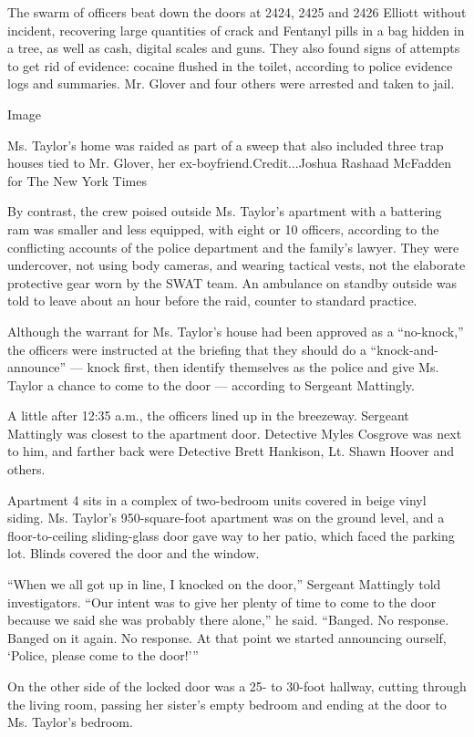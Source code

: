 The swarm of officers beat down the doors at 2424, 2425 and 2426 Elliott
without incident, recovering large quantities of crack and Fentanyl
pills in a bag hidden in a tree, as well as cash, digital scales and
guns. They also found signs of attempts to get rid of evidence: cocaine
flushed in the toilet, according to police evidence logs and summaries.
Mr. Glover and four others were arrested and taken to jail.

Image

Ms. Taylor's home was raided as part of a sweep that also included three
trap houses tied to Mr. Glover, her ex-boyfriend.Credit...Joshua Rashaad
McFadden for The New York Times

By contrast, the crew poised outside Ms. Taylor's apartment with a
battering ram was smaller and less equipped, with eight or 10 officers,
according to the conflicting accounts of the police department and the
family's lawyer. They were undercover, not using body cameras, and
wearing tactical vests, not the elaborate protective gear worn by the
SWAT team. An ambulance on standby outside was told to leave about an
hour before the raid, counter to standard practice.

Although the warrant for Ms. Taylor's house had been approved as a
``no-knock,'' the officers were instructed at the briefing that they
should do a ``knock-and-announce'' --- knock first, then identify
themselves as the police and give Ms. Taylor a chance to come to the
door --- according to Sergeant Mattingly.

A little after 12:35 a.m., the officers lined up in the breezeway.
Sergeant Mattingly was closest to the apartment door. Detective Myles
Cosgrove was next to him, and farther back were Detective Brett
Hankison, Lt. Shawn Hoover and others.

Apartment 4 sits in a complex of two-bedroom units covered in beige
vinyl siding. Ms. Taylor's 950-square-foot apartment was on the ground
level, and a floor-to-ceiling sliding-glass door gave way to her patio,
which faced the parking lot. Blinds covered the door and the window.

``When we all got up in line, I knocked on the door,'' Sergeant
Mattingly told investigators. ``Our intent was to give her plenty of
time to come to the door because we said she was probably there alone,''
he said. ``Banged. No response. Banged on it again. No response. At that
point we started announcing ourself, `Police, please come to the
door!'''

On the other side of the locked door was a 25- to 30-foot hallway,
cutting through the living room, passing her sister's empty bedroom and
ending at the door to Ms. Taylor's bedroom.

